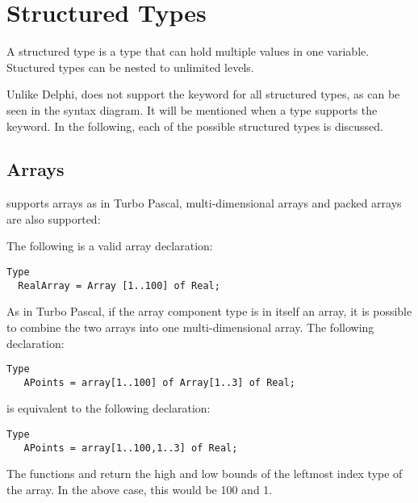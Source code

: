 \section{Structured Types}
A structured type is a type that can hold multiple values in one variable.
Stuctured types can be nested to unlimited levels.

Unlike Delphi, \fpc does not support the keyword  for all
structured types, as can be seen in the syntax diagram. It will be mentioned
when a type supports the  keyword.
In the following, each of the possible structured types is discussed.
\subsection{Arrays}
\fpc supports arrays as in Turbo Pascal, multi-dimensional arrays
and packed arrays are also supported:

The following is a valid array declaration:
\begin{verbatim}
Type
  RealArray = Array [1..100] of Real;
\end{verbatim}
As in Turbo Pascal, if the array component type is in itself an array, it is
possible to combine the two arrays into one multi-dimensional array. The
following declaration:
\begin{verbatim}
Type
   APoints = array[1..100] of Array[1..3] of Real;
\end{verbatim}
is equivalent to the following declaration:
\begin{verbatim}
Type
   APoints = array[1..100,1..3] of Real;
\end{verbatim}
The functions  and  return the high and low bounds of
the leftmost index type of the array. In the above case, this would be 100
and 1.
